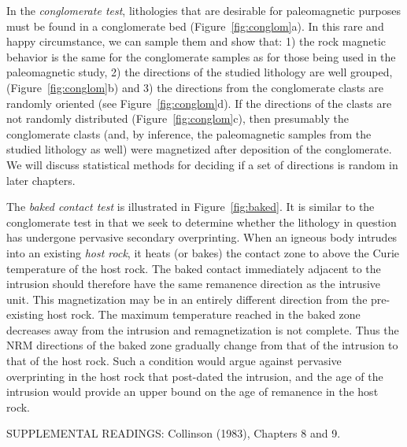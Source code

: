 In the
 {\it conglomerate test}, lithologies that are  desirable for
paleomagnetic purposes must be found in a conglomerate bed
(Figure~\ref{fig:conglom}a).  In this
rare and happy circumstance, we can sample them and show that: 1) the
rock magnetic behavior is the same  for the conglomerate samples as
for those being used in the paleomagnetic study, 2) the directions
of the studied lithology are well grouped, (Figure~\ref{fig:conglom}b) and
3) the directions from the conglomerate clasts 
are randomly oriented (see Figure~\ref{fig:conglom}d).  If the directions of the clasts are not randomly distributed
(Figure~\ref{fig:conglom}c), 
then presumably the conglomerate clasts (and, by inference, 
the paleomagnetic samples from the studied lithology as
well) were magnetized after deposition of the conglomerate. 
We will discuss statistical methods for deciding if a set of directions
is random in later chapters.  


%
The {\it baked contact test} is illustrated in Figure~\ref{fig:baked}.  It
is similar to the conglomerate test in that we seek to determine whether the 
lithology in question has undergone pervasive secondary overprinting.  When
an igneous body intrudes into an existing 
{\it host rock}, it heats (or bakes) the contact zone to above the Curie temperature of the host
rock.  The baked contact immediately adjacent to the intrusion should therefore
have the same remanence direction as the intrusive unit.  This
magnetization
may be in an entirely different direction from the pre-existing host rock. The
maximum temperature reached in the baked zone decreases away from the intrusion
and remagnetization is not complete.  Thus the NRM directions of the baked zone
gradually change from that of the intrusion to that of the host rock.  Such
a condition would argue against pervasive overprinting in the  host rock that post-dated the
intrusion,  and the age of the intrusion would provide an 
upper bound on the age of remanence in the host rock.

\vskip 6pt
\noindent SUPPLEMENTAL READINGS: Collinson (1983), Chapters 8 and 9. \nocite{collinson83}

\vskip -6pt

